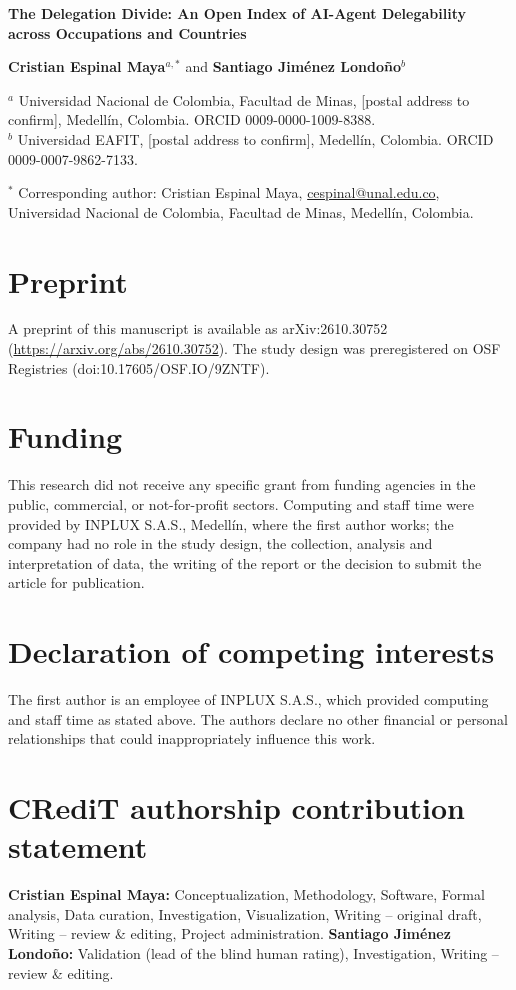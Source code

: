 \documentclass[12pt]{article}
\begin{document}
{\Large\bfseries The Delegation Divide: An Open Index of AI-Agent Delegability across Occupations and Countries}

\textbf{Cristian Espinal Maya}$^{a,*}$ and \textbf{Santiago Jim\'enez Londo\~no}$^{b}$

$^{a}$ Universidad Nacional de Colombia, Facultad de Minas, [postal address to confirm], Medell\'in, Colombia. ORCID 0009-0000-1009-8388.\\
$^{b}$ Universidad EAFIT, [postal address to confirm], Medell\'in, Colombia. ORCID 0009-0007-9862-7133.

$^{*}$ Corresponding author: Cristian Espinal Maya, \href{mailto:cespinal@unal.edu.co}{cespinal@unal.edu.co}, Universidad Nacional de Colombia, Facultad de Minas, Medell\'in, Colombia.

\section*{Preprint}
A preprint of this manuscript is available as arXiv:2610.30752 (\url{https://arxiv.org/abs/2610.30752}). The study design was preregistered on OSF Registries (doi:10.17605/OSF.IO/9ZNTF).

\section*{Funding}
This research did not receive any specific grant from funding agencies in the public, commercial, or not-for-profit sectors. Computing and staff time were provided by INPLUX S.A.S., Medell\'in, where the first author works; the company had no role in the study design, the collection, analysis and interpretation of data, the writing of the report or the decision to submit the article for publication.

\section*{Declaration of competing interests}
The first author is an employee of INPLUX S.A.S., which provided computing and staff time as stated above. The authors declare no other financial or personal relationships that could inappropriately influence this work.

\section*{CRediT authorship contribution statement}
\textbf{Cristian Espinal Maya:} Conceptualization, Methodology, Software, Formal analysis, Data curation, Investigation, Visualization, Writing -- original draft, Writing -- review \& editing, Project administration.
\textbf{Santiago Jim\'enez Londo\~no:} Validation (lead of the blind human rating), Investigation, Writing -- review \& editing.
\end{document}
